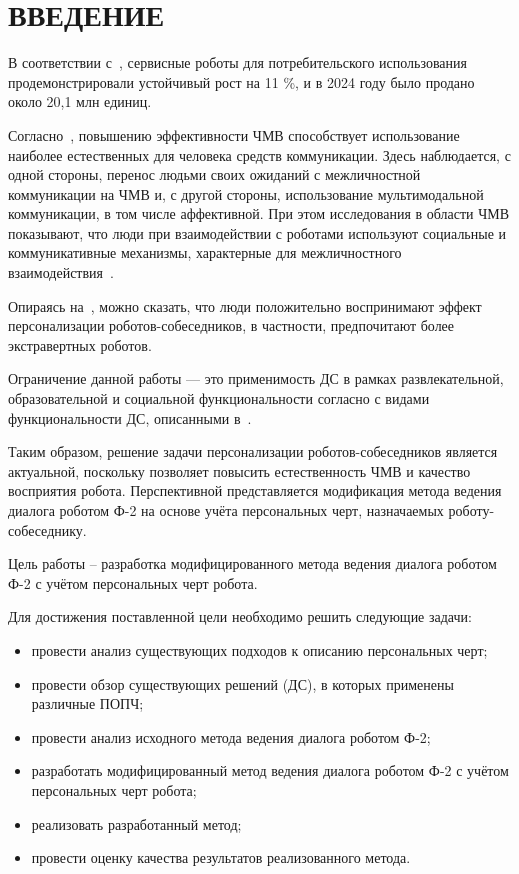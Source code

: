 \chapter*{ВВЕДЕНИЕ}

В соответствии с~\cite{international_federation_of_robotics}, сервисные роботы для потребительского использования продемонстрировали устойчивый рост на 11 \%, и в 2024 году было продано около 20,1 млн единиц.

Согласно~\cite{ronzhin2006speech}, повышению эффективности ЧМВ способствует использование наиболее естественных для человека средств коммуникации. 
Здесь наблюдается, с одной стороны, перенос людьми своих ожиданий с межличностной коммуникации на ЧМВ и, с другой стороны, использование мультимодальной коммуникации, в том числе аффективной.
При этом исследования в области ЧМВ показывают, что люди при взаимодействии с роботами используют социальные и коммуникативные механизмы, характерные для межличностного взаимодействия~\cite{park2012lawofattraction}. 

Опираясь на~\cite{review_of_personality_of_hri}, можно сказать, что люди положительно воспринимают эффект персонализации роботов-собеседников, в частности, предпочитают более экстравертных роботов.

Ограничение данной работы --- это применимость ДС в рамках развлекательной, образовательной и социальной функциональности согласно с видами функциональности ДС, описанными в~\cite{Volkova2023_dialogue_systems}.

Таким образом, решение задачи персонализации роботов-собеседников является актуальной, поскольку позволяет повысить естественность ЧМВ и качество восприятия робота.
Перспективной представляется модификация метода ведения диалога роботом Ф-2 на основе учёта персональных черт, назначаемых роботу-собеседнику.

Цель работы -- разработка модифицированного метода ведения диалога роботом Ф-2 с учётом персональных черт робота.

Для достижения поставленной цели необходимо решить следующие задачи:

\begin{itemize}
	\item провести анализ существующих подходов к описанию персональных черт;

	\item провести обзор существующих решений (ДС), в которых применены различные ПОПЧ;

	\item провести анализ исходного метода ведения диалога роботом Ф-2;
	
	\item разработать модифицированный метод ведения диалога роботом Ф-2 с учётом персональных черт робота;
	
	\item реализовать разработанный метод;
	
	\item провести оценку качества результатов реализованного метода.

\end{itemize}
